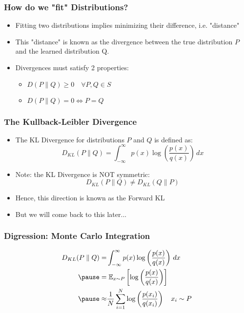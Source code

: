 \documentclass{beamer}
\begin{document}
\begin{frame}
  \frametitle{How do we "fit" Distributions?}
  \begin{itemize}
    \item Fitting two distributions implies minimizing their difference,
      i.e. "distance"
    \item This "distance" is known as the divergence between the true distribution
    $P$ and the learned distribution Q.
    \pause
    \item Divergences must satisfy 2 properties:
    \begin{itemize}
      \item $D(P \parallel Q ) \geq 0 \quad \forall P, Q \in S$
      \item $D(P \parallel Q ) = 0 \iff P = Q$
    \end{itemize}
  \end{itemize}

\end{frame}

\begin{frame}
  \frametitle{The Kullback-Leibler Divergence}
  \begin{itemize}
    \item The KL Divergence for distributions $P$ and $Q$ is defined as:
    \begin{equation*}
      D_{KL} (P \parallel Q) = \int_{-\infty}^{\infty} p(x)\log \left({\frac {p(x)}{q(x)}}\right)\,dx
    \end{equation*}
    \pause
    \item Note: the KL Divergence is NOT symmetric:
    \begin{equation*}
      D_{KL} (P \parallel Q) \not= D_{KL} (Q \parallel P)
    \end{equation*}
    \item Hence, this direction is known as the Forward KL
    \pause
    \item But we will come back to this later...
  \end{itemize}
\end{frame}


\begin{frame}
  \frametitle{Digression: Monte Carlo Integration}
    \begin{equation*}
      \begin{aligned}
      D_{KL} (P \parallel Q) =& \int_{-\infty}^{\infty} p(x)\log \left({\frac {p(x)}{q(x)}}\right)\,dx \\
      \pause
      =& \; \mathbb{E}_{x \sim P} \left[ \log \left( \frac{p(x)}{q(x)} \right) \right] \\
      \pause
      \approx& \frac{1}{N}\sum_{i=1}^{N} \log \left( \frac{p(x_i)}{q(x_i)} \right) \quad x_i \sim P
      \end{aligned}
    \end{equation*}
\end{frame}
\end{document}
